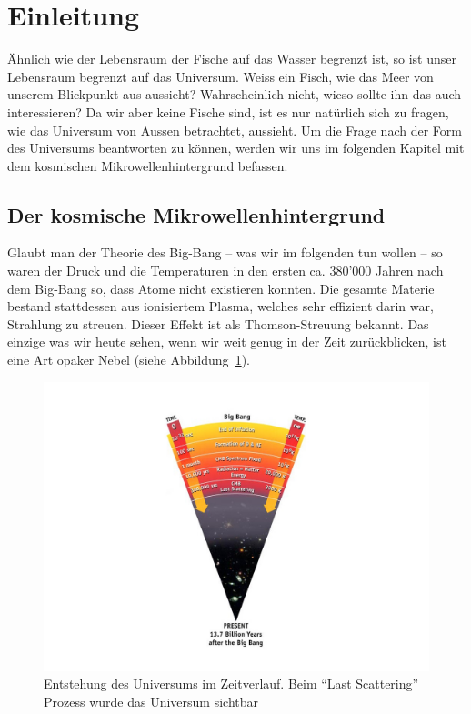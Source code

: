 \section{Einleitung}
Ähnlich wie der Lebensraum der Fische auf das Wasser begrenzt ist, so ist unser 
Lebensraum begrenzt auf das Universum.
Weiss ein Fisch, wie das Meer von unserem Blickpunkt aus aussieht?
Wahrscheinlich nicht, wieso sollte ihn das auch interessieren?
Da wir aber keine Fische sind, ist es nur natürlich sich zu fragen, wie das 
Universum von Aussen betrachtet, aussieht.
Um die Frage nach der Form des Universums beantworten zu können, werden wir uns 
im folgenden Kapitel mit dem kosmischen Mikrowellenhintergrund befassen.

\subsection{Der kosmische Mikrowellenhintergrund}
Glaubt man der Theorie des Big-Bang -- was wir im folgenden tun wollen -- so 
waren 
der Druck und die Temperaturen in den ersten ca. 380'000 Jahren nach dem 
Big-Bang so, dass Atome nicht existieren konnten.
Die gesamte Materie bestand stattdessen aus ionisiertem Plasma, welches sehr 
effizient darin war, Strahlung zu streuen. Dieser Effekt ist als 
Thomson-Streuung bekannt.
Das einzige was wir heute sehen, wenn wir weit genug in der Zeit zurückblicken,
ist eine Art opaker Nebel (siehe Abbildung~\ref{fig:radiation_scattering}).
\begin{figure}
	\centering
	\includegraphics[width=\linewidth]{cmb/images/radiation_scattering.jpg}
	\caption{Entstehung des Universums im Zeitverlauf. Beim ``Last Scattering'' 
	Prozess wurde das Universum sichtbar}
	\label{fig:radiation_scattering}
\end{figure}


